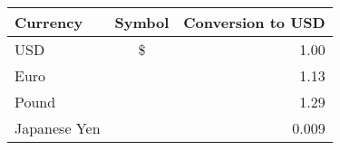 \usepackage{textcomp}  %

\begin{table}[!h]
	\begin{tabular}{|l|cr|}
		\hline
		Currency & Symbol & Conversion to USD \\\hline
		USD & \$ & 1.00 \\
		Euro & \texteuro & 1.13 \\
		Pound & \textsterling & 1.29 \\
		Japanese Yen & \textyen & 0.009 \\
		\hline
	\end{tabular}
\end{table}
